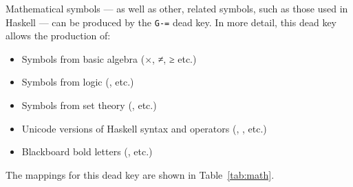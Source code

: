 \documentclass[oneside]{memoir}
\newcommand{\key}{\verb}
\newcommand{\out}[1]{\colorbox{gray!20}{#1}}
\begin{document}
Mathematical symbols --- as well as other, related symbols, such as those used in Haskell --- can be produced by the \key|G-=| dead key.
In more detail, this dead key allows the production of:
\begin{itemize}[noitemsep]
\item Symbols from basic algebra (\out{×}, \out{≠}, \out{≥} etc.)
\item Symbols from logic (\out{}, \out{} etc.)
\item Symbols from set theory (\out{}, \out{} etc.)
\item Unicode versions of Haskell syntax and operators (\out{}, \out{}, \out{} etc.)
\item Blackboard bold letters (\out{}, \out{} etc.)
\end{itemize}
The mappings for this dead key are shown in Table~\ref{tab:math}.
\end{document}
